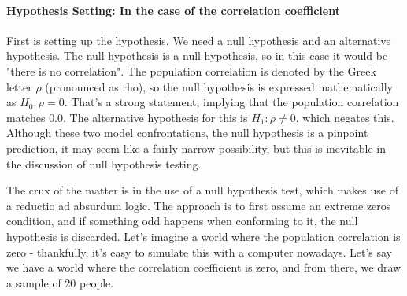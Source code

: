 \documentclass{ltjsbook}
\begin{document}
\paragraph{Hypothesis Setting: In the case of the correlation coefficient}
First is setting up the hypothesis. We need a null hypothesis and an alternative hypothesis. The null hypothesis is a null hypothesis, so in this case it would be "there is no correlation".
The population correlation is denoted by the Greek letter $\rho$ (pronounced as rho), so the null hypothesis is expressed mathematically as $H_0: \rho=0$. That's a strong statement, implying that the population correlation matches $0.0$.
The alternative hypothesis for this is $H_1: \rho \neq 0$, which negates this. Although these two model confrontations, the null hypothesis is a pinpoint prediction, it may seem like a fairly narrow possibility, but this is inevitable in the discussion of null hypothesis testing.

The crux of the matter is in the use of a null hypothesis test, which makes use of a reductio ad absurdum logic. The approach is to first assume an extreme zeros condition, and if something odd happens when conforming to it, the null hypothesis is discarded. Let's imagine a world where the population correlation is zero - thankfully, it's easy to simulate this with a computer nowadays. Let's say we have a world where the correlation coefficient is zero, and from there, we draw a sample of 20 people.


\end{document}

